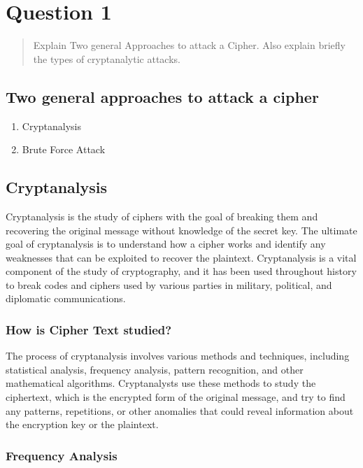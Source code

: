 \documentclass[11pt]{article}
\begin{document}
\tableofcontents
\thispagestyle{empty}
\clearpage

\setcounter{page}{1}

\section{Question 1}
\begin{quotation}
    Explain Two general Approaches to attack a Cipher. Also explain briefly the types of cryptanalytic attacks.
\end{quotation}

\subsection*{Two general approaches to attack a cipher}
\begin{enumerate}
    \item Cryptanalysis
    \item Brute Force Attack
\end{enumerate}


\subsection{Cryptanalysis}

Cryptanalysis is the study of ciphers with the goal of breaking them and recovering the original message without knowledge of the secret key. The ultimate goal of cryptanalysis is to understand how a cipher works and identify any weaknesses that can be exploited to recover the plaintext. Cryptanalysis is a vital component of the study of cryptography, and it has been used throughout history to break codes and ciphers used by various parties in military, political, and diplomatic communications.

\subsubsection{How is Cipher Text studied? }

The process of cryptanalysis involves various methods and techniques, including statistical analysis, frequency analysis, pattern recognition, and other mathematical algorithms. Cryptanalysts use these methods to study the ciphertext, which is the encrypted form of the original message, and try to find any patterns, repetitions, or other anomalies that could reveal information about the encryption key or the plaintext.

\subsubsection{Frequency Analysis}
\end{document}
